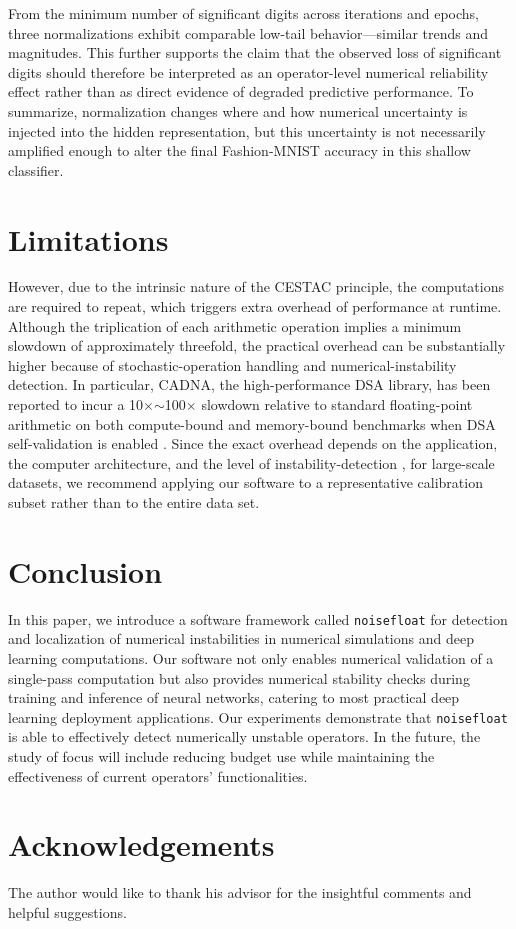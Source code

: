 \documentclass[manuscript, screen]{acmart}
\begin{document}
From the minimum number of significant digits across iterations and epochs, three normalizations exhibit comparable low-tail behavior{---}similar trends and magnitudes. This further supports the claim that the observed loss of significant digits should therefore be interpreted as an operator-level numerical reliability effect rather than as direct evidence of degraded predictive performance.  To summarize, normalization changes where and how numerical uncertainty is injected into the hidden representation, but this uncertainty is not necessarily amplified enough to alter the final Fashion-MNIST accuracy in this shallow classifier.




\section{Limitations}

However, due to the intrinsic nature of the CESTAC principle, the computations are required to repeat, which triggers extra overhead of performance at runtime. Although the triplication of each arithmetic operation implies a minimum slowdown of approximately threefold, the practical overhead can be substantially higher because of stochastic-operation handling and numerical-instability detection. In particular, CADNA, the high-performance DSA library, has been reported to incur a 10$\times$$\sim$100$\times$ slowdown relative to standard floating-point arithmetic on both compute-bound and memory-bound benchmarks when DSA self-validation is enabled \cite{6614304, jezequel2020trustworthy}. Since the exact overhead depends on the application, the computer architecture, and the level of instability-detection \cite{Jez2008,eberhart2015high}, for large-scale datasets, we recommend applying our software to a representative calibration subset rather than to the entire data set.


\section{Conclusion}

In this paper, we introduce a software framework called \texttt{noisefloat} for detection and localization of numerical instabilities in numerical simulations and deep learning computations. Our software not only enables numerical validation of a single-pass computation but also provides numerical stability checks during training and inference of neural networks, catering to most practical deep learning deployment applications.  Our experiments demonstrate that \texttt{noisefloat} is able to effectively detect numerically unstable operators. In the future, the study of focus will include reducing budget use while maintaining the effectiveness of current operators' functionalities.  




\section{Acknowledgements}

The author would like to thank his advisor for the insightful comments and helpful suggestions.




\end{document}
